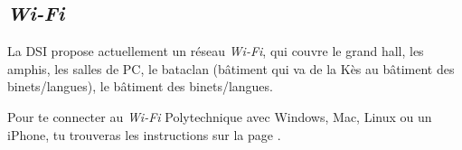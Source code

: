 \subsection{\emph{Wi-Fi}}
La DSI propose actuellement un réseau \emph{Wi-Fi}, qui couvre le grand hall, les amphis, les salles de PC, le bataclan (bâtiment qui va de la Kès au bâtiment des
binets/langues), le bâtiment des binets/langues.

Pour te connecter au \emph{Wi-Fi} Polytechnique avec Windows, Mac, Linux ou un iPhone, tu trouveras les instructions sur la page .

%
%




